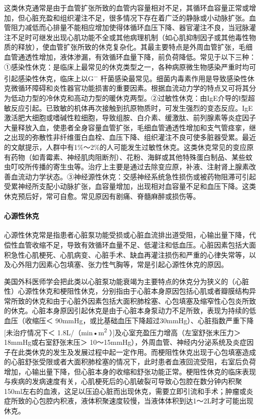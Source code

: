 这类休克通常是由于血管扩张所致的血管内容量相对不足，其循环血容量正常或增加，但心脏充盈和组织灌注不足，很多情况下存在着广泛的静脉或小动脉扩张。血管阻力减低而心排量不能相应增加使得体循环血压下降、器官灌注不良，当冠脉灌注不足时可继发出现心肌功能不全或其他病理机制（如心肌抑制因子或其他毒性物质的释放），使血管扩张所致的休克复杂化。其最主要特点是外周血管扩张，毛细血管通透性增加，液体渗漏，有效循环血量下降，前负荷降低。常见于以下三种：①感染性休克：是临床上最常见的休克类型之一，各种病原微生物感染严重时均可引起感染性休克，临床上以G\textsuperscript{−}
杆菌感染最常见。细菌内毒素作用是导致感染性休克微循环障碍和炎性器官功能损害的重要因素。根据血流动力学的特点又可将其分为低动力型的冷休克和高动力型的暖休克两型。②过敏性休克：由IgE介导的Ⅰ型超敏反应引起。已致敏的机体再次接触到抗原物质时，可发生强烈的变态反应。IgE激活肥大细胞或嗜碱性粒细胞，导致组胺、白介素、缓激肽、前列腺素等炎症因子大量释放入血，使患者全身容量血管扩张，毛细血管通透性增加和支气管痉挛，继之出现的弥散性非纤维蛋白血栓、血压下降、组织灌注不良可使多脏器受累。最近的文献提示，人群中有1\%～2\%的人可能发生过敏性休克。这类休克常见的变应原有药物（如青霉素、神经肌肉阻断剂）、花粉、海鲜或其他特殊蛋白制品、某些蚊虫叮咬所传播的寄生虫等。治疗上主要是通过去除变应原，补液、注射肾上腺素改善血流动力学状态。③神经源性休克：交感神经系统急性损伤或被药物阻滞可引起受累神经所支配小动脉扩张，血容量增加，出现相对血容量不足和血压下降。这类休克预后好，常可自愈。常见原因有剧痛、脊髓麻醉或损伤等。

\paragraph{心源性休克}

心源性休克常是指患者心脏泵功能受损或心脏血流排出道受阻，心输出量下降，代偿性血管收缩不足，导致有效循环血量不足、低灌注和低血压。心脏因素包括大面积急性心肌梗死、心肌病变、心脏手术、缺血再灌注损伤和严重的心律失常等，以及心外阻力因素心包填塞、张力性气胸等，常是引起心源性休克的原因。

美国外科医师学会把此类以心脏泵功能衰竭为主要特点的休克分为狭义的（心脏性）心源性休克和梗阻性休克，分别指由于心脏本身原因包括心肌或者瓣膜结构异常所致的休克和由于心脏外因素包括大面积肺栓塞、心包填塞及缩窄性心包炎所致的休克。心脏本身原因引起休克是由于心脏本身泵动力不足所致，表现为持续的低血压（收缩压＜
90mmHg，或比基础血压下降超过30mmHg）、心脏指数严重下降{[}未治疗情况下＜
1.8L/（min•m\textsuperscript{2}
）{]}及心室充盈压力增高（左室舒张末压力＞ 18mmHg或右室舒张末压＞
10～15mmHg），外周血管、神经内分泌系统及炎症因子在此类休克的发生及发展过程中起一定作用。而梗阻性休克出现于心包填塞造成的心脏舒张受限或者大面积肺栓塞的情况下，此时患者血液回流受阻，右室后负荷增加，心输出量下降，但心脏本身的收缩和舒张功能正常。梗阻性休克的临床表现与疾病的发病速度有关，心肌梗死后的心肌破裂可导致心包腔在数分钟内积聚150ml左右的血液，这足以压迫心脏而出现休克，需要立即引流和手术；肿瘤或炎症所致的心包腔内积液，液体积聚速度较慢，当液体体积到达1～2L时才可能出现休克。

